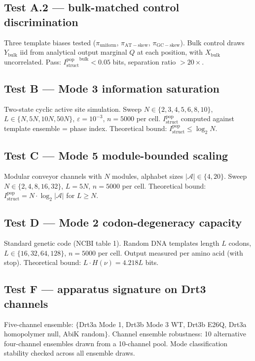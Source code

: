 \documentclass[aps,prx,reprint,amsmath,amssymb,floatfix,superscriptaddress,nofootinbib]{revtex4-2}
\theoremstyle{plain-thm}
\theoremstyle{definition-thm}
\newcommand{\Istructpop}{I_{\mathrm{struct}}^{\mathrm{pop}}}
\begin{document}
\subsection{Test A.2 --- bulk-matched control discrimination}

Three template biases tested ($\pi_{\mathrm{uniform}}$, $\pi_{\mathrm{AT-skew}}$, $\pi_{\mathrm{GC-skew}}$). Bulk control draws $Y_{\mathrm{bulk}}$ iid from analytical output marginal $Q$ at each position, with $X_{\mathrm{bulk}}$ uncorrelated. Pass: ${\Istructpop}^{\mathrm{bulk}} < 0.05$ bits, separation ratio $> 20\times$.

\subsection{Test B --- Mode 3 information saturation}

Two-state cyclic active site simulation. Sweep $N \in \{2, 3, 4, 5, 6, 8, 10\}$, $L \in \{N, 5N, 10N, 50N\}$, $\varepsilon = 10^{-3}$, $n = 5000$ per cell. $\Istructpop$ computed against template ensemble = phase index. Theoretical bound: $\Istructpop \le \log_2 N$.

\subsection{Test C --- Mode 5 module-bounded scaling}

Modular conveyor channels with $N$ modules, alphabet sizes $|\mathcal{A}| \in \{4, 20\}$. Sweep $N \in \{2, 4, 8, 16, 32\}$, $L = 5N$, $n = 5000$ per cell. Theoretical bound: $\Istructpop = N \cdot \log_2 |\mathcal{A}|$ for $L \ge N$.

\subsection{Test D --- Mode 2 codon-degeneracy capacity}

Standard genetic code (NCBI table 1). Random DNA templates length $L$ codons, $L \in \{16, 32, 64, 128\}$, $n = 5000$ per cell. Output measured per amino acid (with stop). Theoretical bound: $L \cdot H(\nu) = 4.218L$ bits.

\subsection{Test F --- apparatus signature on Drt3 channels}

Five-channel ensemble: $\{$Drt3a Mode 1, Drt3b Mode 3 WT, Drt3b E26Q, Drt3a homopolymer null, AbiK random$\}$. Channel ensemble robustness: 10 alternative four-channel ensembles drawn from a 10-channel pool. Mode classification stability checked across all ensemble draws.
\end{document}
